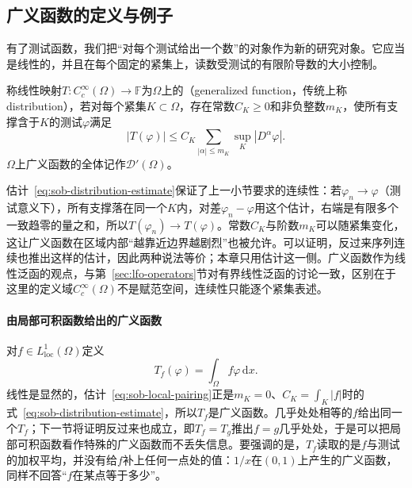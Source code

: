 \subsection{广义函数的定义与例子}
\label{sec:sob-distribution-def}

有了测试函数，我们把“对每个测试给出一个数”的对象作为新的研究对象。它应当是线性的，并且在每个固定的紧集上，读数受测试的有限阶导数的大小控制。

\begin{definition}[广义函数]
\label{def:sob-distribution}
称线性映射$T:C_c^\infty(\Omega)\to\mathbb F$为$\Omega$上的（generalized function，传统上称distribution），若对每个紧集$K\subset\Omega$，存在常数$C_K\ge0$和非负整数$m_K$，使所有支撑含于$K$的测试$\varphi$满足
\begin{equation}
 |T(\varphi)|\le C_K\sum_{|\alpha|\le m_K}\sup_K|D^\alpha\varphi| .
 \label{eq:sob-distribution-estimate}
\end{equation}
$\Omega$上广义函数的全体记作$\mathcal D'(\Omega)$。
\end{definition}

估计~\eqref{eq:sob-distribution-estimate}保证了上一小节要求的连续性：若$\varphi_n\to\varphi$（测试意义下），所有支撑落在同一个$K$内，对差$\varphi_n-\varphi$用这个估计，右端是有限多个一致趋零的量之和，所以$T(\varphi_n)\to T(\varphi)$。常数$C_K$与阶数$m_K$可以随紧集变化，这让广义函数在区域内部“越靠近边界越剧烈”也被允许。可以证明，反过来序列连续也推出这样的估计，因此两种说法等价；本章只用估计这一侧。广义函数作为线性泛函的观点，与第~\ref{sec:lfo-operators}节对有界线性泛函的讨论一致，区别在于这里的定义域$C_c^\infty(\Omega)$不是赋范空间，连续性只能逐个紧集表述。

\paragraph{由局部可积函数给出的广义函数}
对$f\in L^1_{\mathrm{loc}}(\Omega)$定义
\begin{equation}
 T_f(\varphi)=\int_\Omega f\varphi\,\mathrm dx .
 \label{eq:sob-regular-distribution}
\end{equation}
线性是显然的，估计~\eqref{eq:sob-local-pairing}正是$m_K=0$、$C_K=\int_K|f|$时的式~\eqref{eq:sob-distribution-estimate}，所以$T_f$是广义函数。几乎处处相等的$f$给出同一个$T_f$；下一节将证明反过来也成立，即$T_f=T_g$推出$f=g$几乎处处，于是可以把局部可积函数看作特殊的广义函数而不丢失信息。要强调的是，$T_f$读取的是$f$与测试的加权平均，并没有给$f$补上任何一点处的值：$1/x$在$(0,1)$上产生的广义函数，同样不回答“$f$在某点等于多少”。

